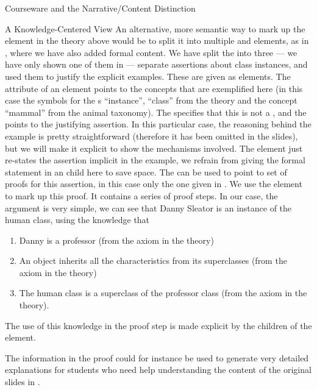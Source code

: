 \begin{tchapter}[id=courseware]{Courseware and the Narrative/Content Distinction}
\begin{tsection}[id=knowledge-centered]{A Knowledge-Centered View}
An alternative, more semantic way to mark up the {} element in the
theory above would be to split it into multiple {} and
{} elements, as in {}, where we have also added
formal content. We have split the {} {} into
three --- we have only shown one of them in {} --- separate
assertions about class instances, and used them to justify the explicit examples. These
are given as {\omdoc} {} elements. The {}
attribute of an {} element points to the concepts that are exemplified
here (in this case the symbols for the {s} ``instance'', ``class'' from
the theory {} and the concept ``mammal'' from the animal taxonomy). The
{} specifies that this is not a {}, and
the {} points to the justifying assertion. In this
particular case, the reasoning behind the example is pretty straightforward (therefore it
has been omitted in the slides), but we will make it explicit to show the mechanisms
involved. The {} element just re-states the assertion implicit in the
example, we refrain from giving the formal statement in an {} child here to
save space. The {} can be used to point to set of proofs for
this assertion, in this case only the one given in {}. We use the
{\omdoc} {} element to mark up this proof.  It contains a series of
{} proof steps. In our case, the argument is very simple, we can see that
Danny Sleator is an instance of the human class, using the knowledge that
\begin{enumerate}
\item Danny is a professor (from the axiom in the {} theory)
\item An object inherits all the characteristics from its superclasses (from the
  axiom {} in the {} theory)
\item The human class is a superclass of the professor class (from the axiom
  {} in the {} theory).
\end{enumerate}
The use of this knowledge in the proof step is made explicit by the
{} children of the {} element.

The information in the proof could for instance be used to generate very detailed
explanations for students who need help understanding the content of the original
slides in {}.



\end{tsection}
\end{tchapter}
